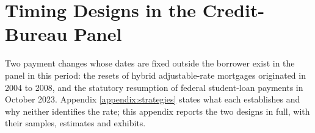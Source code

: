 \section{Timing Designs in the Credit-Bureau Panel}\label{appendix:timing}

Two payment changes whose dates are fixed outside the borrower exist in the panel in this period: the resets of hybrid adjustable-rate mortgages originated in 2004 to 2008, and the statutory resumption of federal student-loan payments in October 2023. Appendix \ref{appendix:strategies} states what each establishes and why neither identifies the rate; this appendix reports the two designs in full, with their samples, estimates and exhibits.



